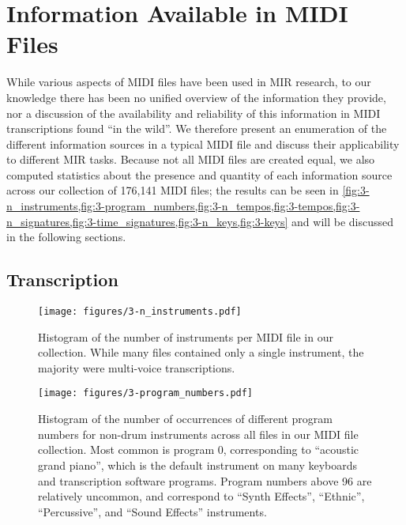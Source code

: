 \section{Information Available in MIDI Files}
\label{sec:information}

While various aspects of MIDI files have been used in MIR research, to our knowledge there has been no unified overview of the information they provide, nor a discussion of the availability and reliability of this information in MIDI transcriptions found ``in the wild''.
We therefore present an enumeration of the different information sources in a typical MIDI file and discuss their applicability to different MIR tasks.
Because not all MIDI files are created equal, we also computed statistics about the presence and quantity of each information source across our collection of 176,141 MIDI files; the results can be seen in \cref{fig:3-n_instruments,fig:3-program_numbers,fig:3-n_tempos,fig:3-tempos,fig:3-n_signatures,fig:3-time_signatures,fig:3-n_keys,fig:3-keys} and will be discussed in the following sections.

\subsection{Transcription}

\begin{figure}
  \centering
  \texttt{[image: figures/3-n\_instruments.pdf]}
  \caption[Histogram of the number of instruments in MIDI files]{Histogram of the number of instruments per MIDI file in our collection.
While many files contained only a single instrument, the majority were multi-voice transcriptions.}
    \label{fig:3-n_instruments}
\end{figure}

\begin{figure}
  \centering
  \texttt{[image: figures/3-program\_numbers.pdf]}
  \caption[Histogram of program numbers]{Histogram of the number of occurrences of different program numbers for non-drum instruments across all files in our MIDI file collection.
Most common is program 0, corresponding to ``acoustic grand piano'', which is the default instrument on many keyboards and transcription software programs.
Program numbers above 96 are relatively uncommon, and correspond to ``Synth Effects'', ``Ethnic'', ``Percussive'', and ``Sound Effects'' instruments.}
    \label{fig:3-program_numbers}
\end{figure}

